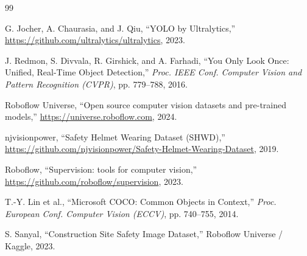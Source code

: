 \documentclass[journal,onecolumn,11pt]{IEEEtran}
\begin{document}
\begin{thebibliography}{99}

G. Jocher, A. Chaurasia, and J. Qiu,
``YOLO by Ultralytics,''
\url{https://github.com/ultralytics/ultralytics}, 2023.

J. Redmon, S. Divvala, R. Girshick, and A. Farhadi,
``You Only Look Once: Unified, Real-Time Object Detection,''
\emph{Proc. IEEE Conf. Computer Vision and Pattern Recognition
(CVPR)}, pp. 779--788, 2016.

Roboflow Universe,
``Open source computer vision datasets and pre-trained models,''
\url{https://universe.roboflow.com}, 2024.

njvisionpower,
``Safety Helmet Wearing Dataset (SHWD),''
\url{https://github.com/njvisionpower/Safety-Helmet-Wearing-Dataset},
2019.

Roboflow,
``Supervision: tools for computer vision,''
\url{https://github.com/roboflow/supervision}, 2023.

T.-Y. Lin et al.,
``Microsoft COCO: Common Objects in Context,''
\emph{Proc. European Conf. Computer Vision (ECCV)}, pp. 740--755,
2014.

S. Sanyal,
``Construction Site Safety Image Dataset,''
Roboflow Universe / Kaggle, 2023.

\end{thebibliography}
\end{document}
